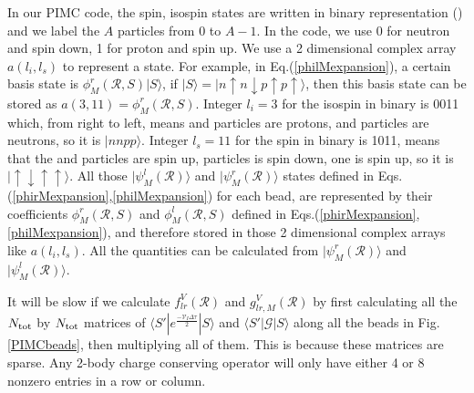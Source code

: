 \documentclass[12pt,letterpaper,UTF8]{report}
\begin{document}
In our PIMC code, the spin, isospin states are written in binary representation (\cite{Koonin91}) and we label the $A$ particles from 0 to $A-1$.
In the code, we use 0 for neutron and spin down, 1 for proton and spin up.
We use a 2 dimensional complex array $a(l_i,l_s)$ to represent a state.
For example, in Eq.(\ref{philMexpansion}),
a certain basis state is $\phi^r_{M}(\mathcal{R},S) | S \rangle$, if $|S\rangle=| n \uparrow n \downarrow p \uparrow p \uparrow  \rangle$,
then this basis state can be stored as $a(3,11)=\phi^r_{M}(\mathcal{R},S) $.
Integer $l_i=3$ for the isospin in binary is 0011 which,
from right to left, means  and  particles are protons,  and  particles are neutrons, so it is $| nnpp \rangle$. Integer $l_s=11$ for the spin in binary is 1011, means that the  and  particles are spin up,  particles is spin down,  one is spin up, so it is $| \uparrow \downarrow \uparrow \uparrow \rangle$. All those $| \psi^l_M (\!\mathcal{R}) \rangle$ and $| \psi^r_M (\!\mathcal{R}) \rangle$ states defined in Eqs.(\ref{phirMexpansion},\ref{philMexpansion}) for each bead, are represented by their coefficients $\phi^r_{M}(\mathcal{R},S)$ and $\phi^l_{M}(\mathcal{R},S)$ defined in Eqs.(\ref{phirMexpansion},\ref{philMexpansion}), and therefore stored in those 2 dimensional complex arrays like $a(l_i,l_s)$. All the quantities can be calculated from $| \psi^r_M (\!\mathcal{R}) \rangle$ and $| \psi^l_M (\!\mathcal{R})\rangle$.

It will be slow if we calculate $f^V_{lr}(\mathcal{R})$ and $g^V_{lr,M}(\mathcal{R})$ by first calculating all the $N_{\rm{tot}}$ by $N_{\rm{tot}}$ matrices of $ \langle S' |e^{\frac{- \mathcal{V}_I  \Delta \tau }{2}} | S \rangle $ and $\langle S' |\bm{\mathcal{G}} | S \rangle $ along all the beads in Fig. \ref{PIMCbeads}, then multiplying all of them.
This is because these matrices are sparse.
Any 2-body charge conserving operator will only have either 4 or 8 nonzero entries in a row or column.
\end{document}
